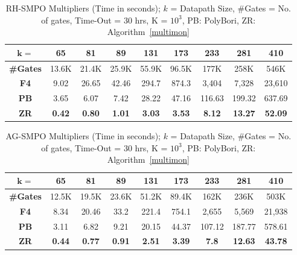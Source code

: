 \begin{table}[ht]
\centering
\caption{RH-SMPO Multipliers (Time in seconds); $k$ = Datapath Size, \#Gates = No. of gates, Time-Out = 30 hrs, K = $10^3$,
PB: PolyBori, ZR: Algorithm~\ref{multimon}}
\label{rhsmpo}
\begin{tabular}{| c | c | c | c | c | c | c | c | c |} \hline
$\boldsymbol{k=}$&65&81&89&131&173&233&281&410 \\ \hline
\textbf{\#Gates} & 13.6K&21.4K & 25.9K& 55.9K &96.5K&177K&258K&546K\\ \hhline{|=|=|=|=|=|=|=|=|=|}
\textbf{F4\cite{pruss:tcad}} &9.02 &26.65 & 42.46&294.7&874.3&3,404&7,328&23,610 \\ \hline
\textbf{PB}  &3.65 &6.07 & 7.42&28.22 &47.16&116.63&199.32&637.69\\ \hline
\textbf{ZR}  & \textbf{0.42}& \textbf{0.80}&\textbf{1.01} & \textbf{3.03}&\textbf{3.53}&
\textbf{8.12}&\textbf{13.27}&\textbf{52.09}\\ \hline
\end{tabular}
\end{table}

\begin{table}[ht]
\centering
\caption{AG-SMPO Multipliers (Time in seconds); $k$ = Datapath Size, \#Gates = No. of gates, Time-Out = 30 hrs, K = $10^3$,
PB: PolyBori, ZR: Algorithm~\ref{multimon}}
\label{agsmpo}
\begin{tabular}{| c | c | c | c | c | c | c | c | c |} \hline
$\boldsymbol{k=}$&65&81&89&131&173&233&281&410 \\ \hline
\textbf{\#Gates} &12.5K & 19.5K&23.6K&51.2K&89.4K&162K&236K&503K \\ \hhline{|=|=|=|=|=|=|=|=|=|}
\textbf{F4\cite{pruss:tcad}} &8.34 &20.46 &33.2&221.4&754.1&2,655&5,569&21,938\\ \hline
\textbf{PB} &3.11 & 6.82& 9.21& 20.15&44.37&107.12&187.77&578.61\\ \hline
\textbf{ZR} &\textbf{0.44} &\textbf{0.77} &\textbf{0.91}& \textbf{2.51}&\textbf{3.39}&
\textbf{7.8}&\textbf{12.63}&\textbf{43.78}\\ \hline
\end{tabular}
\end{table}

